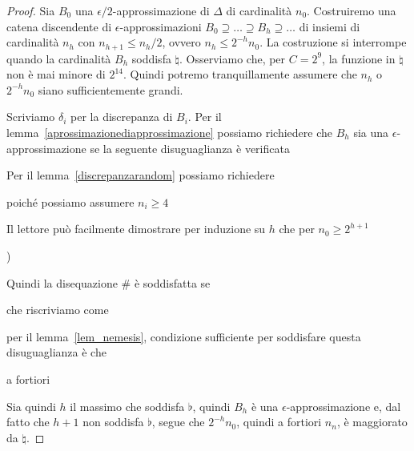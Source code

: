 \begin{proof}
Sia $B_0$ una $\epsilon/2$-approssimazione di $\Delta$ di cardinalit\`a $n_0$. Costruiremo una catena discendente di $\epsilon$-approssimazioni $B_0\supseteq \dots\supseteq B_h\supseteq \dots$ di insiemi di cardinalit\`a $n_h$ con $n_{h+1}\le n_h/2$, ovvero $n_h\le 2^{-h}n_0$. La costruzione si interrompe quando la cardinalit\`a $B_h$ soddisfa $\natural$. Osserviamo che, per $C=2^9$,  la funzione in $\natural$ non \`e mai minore di $2^{14}$. Quindi potremo tranquillamente assumere che $n_h$ o $2^{-h}n_0$ siano sufficientemente grandi. 

Scriviamo $\delta_i$ per la discrepanza di $B_i$. Per il lemma~\ref{aprossimazionediapprossimazione} possiamo richiedere che $B_h$ sia una $\epsilon$-approssimazione se la seguente disuguaglianza \`e verificata


Per il lemma~\ref{discrepanzarandom} possiamo richiedere


\hfill poich\'e possiamo assumere $n_i\ge 4$


Il lettore pu\`o facilmente dimostrare per induzione su $h$ che per $n_0\ge 2^{h+1}$

)

Quindi la disequazione $\#$ \`e soddisfatta se


che riscriviamo come 


per il lemma~\ref{lem_nemesis}, condizione sufficiente per soddisfare questa disuguaglianza \`e che 


a fortiori


Sia quindi $h$ il massimo che soddisfa $\flat$, quindi $B_h$ \`e una $\epsilon$-approssimazione e, dal fatto che $h+1$ non soddisfa $\flat$, segue che $2^{-h}n_0$, quindi a fortiori $n_n$,  \`e maggiorato da $\natural$.
\end{proof}

